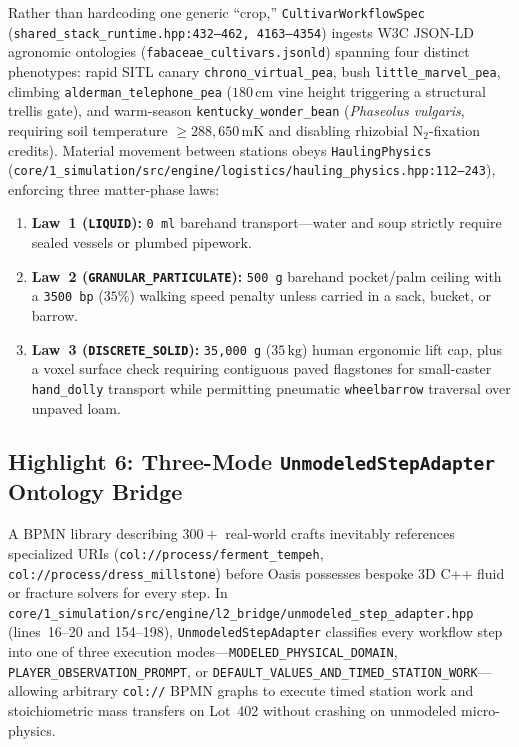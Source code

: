 Rather than hardcoding one generic ``crop,'' \texttt{CultivarWorkflowSpec} (\texttt{shared\_stack\_runtime.hpp:432--462, 4163--4354}) ingests W3C JSON-LD agronomic ontologies (\texttt{fabaceae\_cultivars.jsonld}) \parencite{w3c2020jsonld} spanning four distinct phenotypes: rapid SITL canary \texttt{chrono\_virtual\_pea}, bush \texttt{little\_marvel\_pea}, climbing \texttt{alderman\_telephone\_pea} ($180\,\text{cm}$ vine height triggering a structural trellis gate), and warm-season \texttt{kentucky\_wonder\_bean} (\emph{Phaseolus vulgaris}, requiring soil temperature $\ge 288{,}650\,\text{mK}$ and disabling rhizobial $\text{N}_2$-fixation credits). Material movement between stations obeys \texttt{HaulingPhysics} (\texttt{core/1\_simulation/src/engine/logistics/hauling\_physics.hpp:112--243}), enforcing three matter-phase laws:
\begin{enumerate}
  \item \textbf{Law~1 (\texttt{LIQUID}):} \texttt{0 ml} barehand transport---water and soup strictly require sealed vessels or plumbed pipework.
  \item \textbf{Law~2 (\texttt{GRANULAR\_PARTICULATE}):} \texttt{500 g} barehand pocket/palm ceiling with a \texttt{3500 bp} ($35\%$) walking speed penalty unless carried in a sack, bucket, or barrow.
  \item \textbf{Law~3 (\texttt{DISCRETE\_SOLID}):} \texttt{35,000 g} ($35\,\text{kg}$) human ergonomic lift cap, plus a voxel surface check requiring contiguous paved flagstones for small-caster \texttt{hand\_dolly} transport while permitting pneumatic \texttt{wheelbarrow} traversal over unpaved loam.
\end{enumerate}

\subsection{Highlight 6: Three-Mode \texttt{UnmodeledStepAdapter} Ontology Bridge}

A BPMN library describing $300+$ real-world crafts inevitably references specialized URIs (\texttt{col://process/ferment\_tempeh}, \texttt{col://process/dress\_millstone}) before Oasis possesses bespoke 3D C++ fluid or fracture solvers for every step. In \texttt{core/1\_simulation/src/engine/l2\_bridge/unmodeled\_step\_adapter.hpp} (lines~16--20 and 154--198), \texttt{UnmodeledStepAdapter} classifies every workflow step into one of three execution modes---\texttt{MODELED\_PHYSICAL\_DOMAIN}, \texttt{PLAYER\_OBSERVATION\_PROMPT}, or \texttt{DEFAULT\_VALUES\_AND\_TIMED\_STATION\_WORK}---allowing arbitrary \texttt{col://} BPMN graphs to execute timed station work and stoichiometric mass transfers on Lot~402 without crashing on unmodeled micro-physics.

